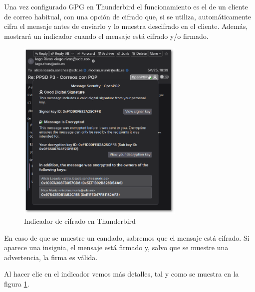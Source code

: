 \begin{tcolorbox}[
    colback=orange!5!white,
    colframe=orange!75!black,
    title=El indicador de cifrado
]
Una vez configurado GPG en Thunderbird el funcionamiento es el de un cliente de correo habitual, con una opción de cifrado que, si se utiliza, automáticamente cifra el mensaje antes de enviarlo y lo muestra descifrado en el cliente. Además, mostrará un indicador cuando el mensaje está cifrado y/o firmado.

\begin{figure}[H]
    \centering
    \includegraphics[width=8cm]{thunderbird-indicador-sombra.png}
    \caption{Indicador de cifrado en Thunderbird}
    \label{fig:indicador-cifrado}
\end{figure}

En caso de que se muestre un candado, sabremos que el mensaje está cifrado. Si aparece una insignia, el mensaje está firmado y, salvo que se muestre una advertencia, la firma es válida.

Al hacer clic en el indicador vemos más detalles, tal y como se muestra en la figura \ref{fig:indicador-cifrado}.
\end{tcolorbox}

